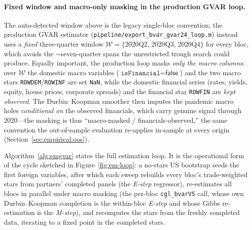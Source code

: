 \documentclass[11pt]{article}
\theoremstyle{definition}
\theoremstyle{remark}
\begin{document}
\paragraph{Fixed window and macro-only masking in the production GVAR
loop.} The auto-detected window above is the legacy single-bloc
convention; the production GVAR estimator
(\texttt{pipeline/export\_bvar\_gvar24\_loop.m}) instead uses a
\emph{fixed} three-quarter window $\mathcal{W}=\{$2020Q2, 2020Q3,
2020Q4$\}$ for every bloc, which avoids the $\sim$seven-quarter spans the
unrestricted trough search could produce. Equally important, the
production loop masks \emph{only the macro columns}: over $\mathcal{W}$
the domestic macro variables (\(\texttt{isFinancial}=\textsf{false}\))
and the two macro stars \texttt{ROWDEM}/\texttt{ROWINF} are set
\texttt{NaN}, while the domestic financial series (rates, yields,
equity, house prices, corporate spreads) and the financial star
\texttt{ROWFIN} are \emph{kept observed}. The Durbin--Koopman smoother
then imputes the pandemic macro holes \emph{conditional on} the observed
financials, which carry genuine signal through 2020---the masking is thus
``macro-masked / financials-observed,'' the same convention the
out-of-sample evaluation re-applies in-sample at every origin
(Section~\ref{sec:empirical:oos}).

Algorithm~\ref{alg:emgvar} states the full estimation loop. It is the
operational form of the cycle sketched in Figure~\ref{fig:em-loop}: a
no-stars US bootstrap seeds the first foreign variables, after which each
sweep rebuilds every bloc's trade-weighted stars from partners' completed
panels (the \emph{E-step} regressor), re-estimates all blocs in parallel
under macro masking (the per-bloc \texttt{cgl\_bvarV5} call, whose own
Durbin--Koopman completion is the within-bloc \emph{E-step} and whose
Gibbs re-estimation is the \emph{M-step}), and recomputes the stars from
the freshly completed data, iterating to a fixed point in the completed
stars.
\end{document}
